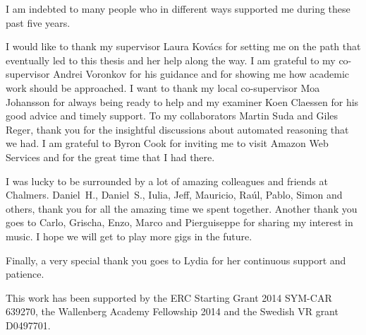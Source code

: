 I am indebted to many people who in different ways supported me during these past five years.

I would like to thank my supervisor Laura Kov\'acs for setting me on the path that eventually led to this thesis and her help along the way. I am grateful to my co-supervisor Andrei Voronkov for his guidance and for showing me how academic work should be approached. I want to thank my local co-supervisor Moa Johansson for always being ready to help and my examiner Koen Claessen for his good advice and timely support. To my collaborators Martin Suda and Giles Reger, thank you for the insightful discussions about automated reasoning that we had. I am grateful to Byron Cook for inviting me to visit Amazon Web Services and for the great time that I had there.

I was lucky to be surrounded by a lot of amazing colleagues and friends at Chalmers. Daniel~H., Daniel~S., Iulia, Jeff, Mauricio, Ra\'ul, Pablo, Simon and others, thank you for all the amazing time we spent together. Another thank you goes to Carlo, Grischa, Enzo, Marco and Pierguiseppe for sharing my interest in music. I hope we will get to play more gigs in the future.

Finally, a very special thank you goes to Lydia for her continuous support and patience.

\vfill

This work has been supported by the ERC Starting Grant 2014 SYM-CAR 639270, the Wallenberg Academy Fellowship 2014 and the Swedish VR grant D0497701.